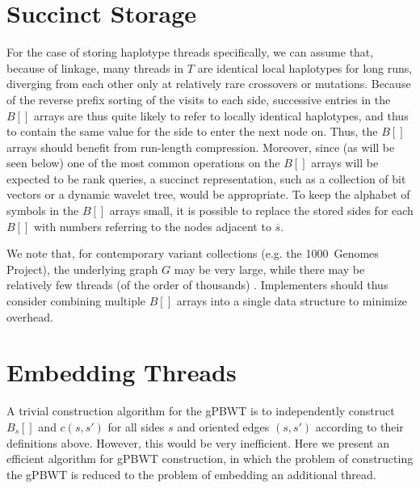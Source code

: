 \section{Succinct Storage}

For the case of storing haplotype threads specifically, we can assume that, because of linkage, many threads in $T$ are identical local haplotypes for long runs, diverging from each other only at relatively rare crossovers or mutations. Because of the reverse prefix sorting of the visits to each side, successive entries in the $B[]$ arrays are thus quite likely to refer to locally identical haplotypes, and thus to contain the same value for the side to enter the next node on. Thus, the $B[]$ arrays should benefit from run-length compression. Moreover, since (as will be seen below) one of the most common operations on the $B[]$ arrays will be expected to be rank queries, a succinct representation, such as a collection of bit vectors or a dynamic wavelet tree, would be appropriate. To keep the alphabet of symbols in the $B[]$ arrays small, it is possible to replace the stored sides for each $B[]$ with numbers referring to the nodes adjacent to $\overline{s}$.

We note that, for contemporary variant collections (e.g. the 1000~Genomes Project), the underlying graph $G$ may be very large, while there may be relatively few threads (of the order of thousands) \cite{10002015global}. Implementers should thus consider combining multiple $B[]$ arrays into a single data structure to minimize overhead.

\section{Embedding Threads}

A trivial construction algorithm for the gPBWT is to independently construct $B_s[]$ and $c(s, s')$ for all sides $s$ and oriented edges $(s, s')$ according to their definitions above. However, this would be very inefficient. Here we present an efficient algorithm for gPBWT construction, in which the problem of constructing the gPBWT is reduced to the problem of embedding an additional thread.

